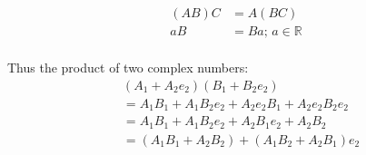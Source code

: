 \documentclass[twoside]{article}
\begin{document}
\begin{multicols*}{2}
$$\begin{aligned}
                    (AB)C &= A(BC) \\
                    aB &= Ba;\, a \in \mathbb{R}\\
                \end{aligned}$$
            \vfill\null\columnbreak
            \par
                Thus the product of two complex numbers: \\
                $$\begin{aligned}
                    & (A_1 + A_2 e_2)(B_1 + B_2 e_2) \\
                    & = A_1 B_1 + A_1 B_2 e_2 + A_2 e_2 B_1 + A_2 e_2 B_2 e_2 \\
                    & = A_1 B_1 + A_1 B_2 e_2 + A_2 B_1 e_2 + A_2 B_2 \\
                    & = (A_1 B_1 + A_2 B_2) + (A_1 B_2 + A_2 B_1) e_2 \\
                \end{aligned}$$

\end{multicols*}
\end{document}
